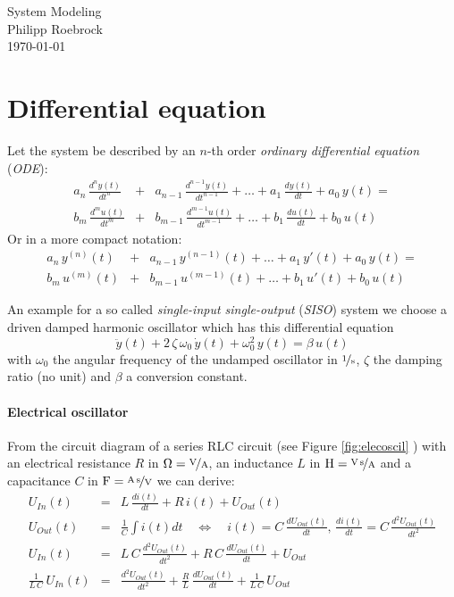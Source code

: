 \documentclass[a4paper,12pt]{article}
\newcommand{\FigRef}[1]{%
	Figure \ref{fig:#1}%
	}
\newcommand{\Section}[2]{\section{#2}\label{section:#1}}
\newcommand{\ELabel}[1]{\label{equation:#1}}
\begin{document}
\vspace{1.5cm}
\begin{center}
{\Huge System Modeling}\\[3ex]
Philipp Roebrock\\[1ex]
\today\\
\end{center}
\vspace{1cm}



\Section{diffeq}{Differential equation}

Let the system be described by an $n$-th order {\em ordinary differential
equation} ({\em ODE}):
\begin{eqnarray}
a_{n}\,\frac{d^{n}y(t)}{dt^{n}}&+&a_{n-1}\,\frac{d^{n-1}y(t)}{dt^{n-1}}+\ldots+a_{1}\,\frac{dy(t)}{dt}+a_{0}\,y(t)=\nonumber\\
b_{m}\,\frac{d^{m}u(t)}{dt^{m}}&+&b_{m-1}\,\frac{d^{m-1}u(t)}{dt^{m-1}}+\ldots+b_{1}\,\frac{du(t)}{dt}+b_{0}\,u(t)
\end{eqnarray}
Or in a more compact notation:
\begin{eqnarray}
\ELabel{ode}
a_{n}\,y^{(n)}(t)&+&a_{n-1}\,y^{(n-1)}(t)+\ldots+a_{1}\,y'(t)+a_{0}\,y(t)=\nonumber\\
b_{m}\,u^{(m)}(t)&+&b_{m-1}\,u^{(m-1)}(t)+\ldots+b_{1}\,u'(t)+b_{0}\,u(t)
\end{eqnarray}

An example for a so called {\em single-input single-output} ({\em SISO}) system
we choose a driven damped harmonic oscillator which has this differential
equation
\begin{equation}
\ddot{y}(t)+2\,\zeta\,\omega_0\,\dot{y}(t)+\omega_0^2\,y(t)=\beta\,u(t)
\end{equation}
with $\omega_0$ the angular frequency of the undamped oscillator in
$\unitfrac{1}{s}$, $\zeta$ the damping ratio (no unit) and $\beta$ a
conversion constant.\\

\paragraph{Electrical oscillator}

From the circuit diagram of a series RLC circuit (see \FigRef{elecoscil}) with
an electrical resistance $R$ in $\unit{\Omega}=\unitfrac{V}{A}$, an inductance
$L$ in $\unit{H}=\unitfrac{V\,s}{A}$ and a capacitance $C$ in
$\unit{F}=\unitfrac{A\,s}{V}$ we can derive:
\begin{eqnarray}
U_{In}(t)&=&L\,\frac{di(t)}{dt}+R\,i(t)+U_{Out}(t)\\
U_{Out}(t)&=&\frac{1}{C}\int i(t)dt\quad\Leftrightarrow\quad i(t)=C\,\frac{dU_{Out}(t)}{dt},\,\frac{di(t)}{dt}=C\,\frac{d^2U_{Out}(t)}{dt^2}\\
U_{In}(t)&=&L\,C\,\frac{d^2U_{Out}(t)}{dt^2}+R\,C\,\frac{dU_{Out}(t)}{dt}+U_{Out}\\
\frac{1}{L\,C}\,U_{In}(t)&=&\frac{d^2U_{Out}(t)}{dt^2}+\frac{R}{L}\,\frac{dU_{Out}(t)}{dt}+\frac{1}{L\,C}\,U_{Out}\\
\end{eqnarray}
\end{document}
